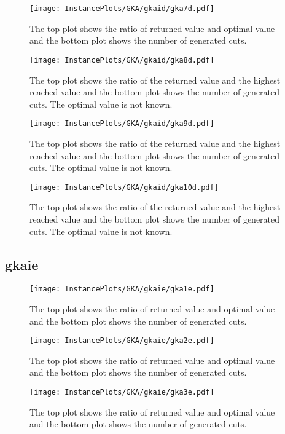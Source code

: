 \documentclass[10pt,a4paper]{article}
\begin{document}
\begin{figure}[H]
\texttt{[image: InstancePlots/GKA/gkaid/gka7d.pdf]}
\caption{The top plot shows the ratio of returned value and optimal value     and the bottom plot shows the number of generated cuts.}
\end{figure}

\begin{figure}[H]
\texttt{[image: InstancePlots/GKA/gkaid/gka8d.pdf]}
\caption{The top plot shows the ratio of the returned value and the highest reached value     and the bottom plot shows the number of generated cuts. The optimal value is not known.}
\end{figure}

\begin{figure}[H]
\texttt{[image: InstancePlots/GKA/gkaid/gka9d.pdf]}
\caption{The top plot shows the ratio of the returned value and the highest reached value     and the bottom plot shows the number of generated cuts. The optimal value is not known.}
\end{figure}

\begin{figure}[H]
\texttt{[image: InstancePlots/GKA/gkaid/gka10d.pdf]}
\caption{The top plot shows the ratio of the returned value and the highest reached value     and the bottom plot shows the number of generated cuts. The optimal value is not known.}
\end{figure}

\subsection{gkaie}
\begin{figure}[H]
\texttt{[image: InstancePlots/GKA/gkaie/gka1e.pdf]}
\caption{The top plot shows the ratio of returned value and optimal value     and the bottom plot shows the number of generated cuts.}
\end{figure}

\begin{figure}[H]
\texttt{[image: InstancePlots/GKA/gkaie/gka2e.pdf]}
\caption{The top plot shows the ratio of returned value and optimal value     and the bottom plot shows the number of generated cuts.}
\end{figure}

\begin{figure}[H]
\texttt{[image: InstancePlots/GKA/gkaie/gka3e.pdf]}
\caption{The top plot shows the ratio of returned value and optimal value     and the bottom plot shows the number of generated cuts.}
\end{figure}
\end{document}
